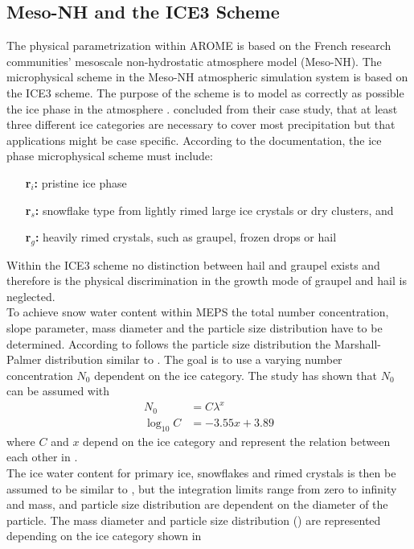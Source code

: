 \subsection{Meso-NH and the ICE3 Scheme} \label{sec:MesoNH}
The physical parametrization within AROME is based on the French research communities' mesoscale non-hydrostatic atmosphere model (Meso-NH). The microphysical scheme in the Meso-NH atmospheric simulation system is based on the ICE3 scheme. The purpose of the scheme is to model as correctly as possible the ice phase in the atmosphere \citep{pinty_mixed-phased_1998}. \cite{mccumber_comparison_1991} concluded from their case study, that at least three different ice categories are necessary to cover most precipitation but that applications might be case specific. 
According to the \cite{meteo_france_meso-nh_2009} documentation, the ice phase microphysical scheme must include: 
\begin{itemize}
	\item [\textbf{r$_i$:}] pristine ice phase  
	\item [\textbf{r$_s$:}] snowflake type from lightly rimed large ice crystals or dry clusters, and
	\item [\textbf{r$_g$:}] heavily rimed crystals, such as graupel, frozen drops or hail
\end{itemize}
% 
Within the ICE3 scheme no distinction between hail and graupel exists and therefore is the physical discrimination in the growth mode of graupel and hail is neglected. \\
To achieve snow water content within MEPS the total number concentration, slope parameter, mass diameter and  the particle size distribution have to be determined. 
According to \cite{caniaux_numerical_1994} follows the particle size distribution the Marshall-Palmer distribution similar to . The goal is to use a varying number concentration $N_0$ dependent on the ice category. The study has shown that $N_0$ can be assumed with
\begin{align}
N_0 & = C \lambda^x  \label{eq:model_N0}
\\
\log_{10}C & = -3.55x + 3.89  \nonumber
\end{align}
where $C$ and $x$ depend on the ice category and represent the relation between each other in . 
\\
The ice water content for primary ice, snowflakes and rimed crystals is then be assumed to be similar to , but the integration limits range from zero to infinity and mass, and particle size distribution are dependent on the diameter of the particle. The mass diameter and particle size distribution () are represented depending on the ice category shown in 
